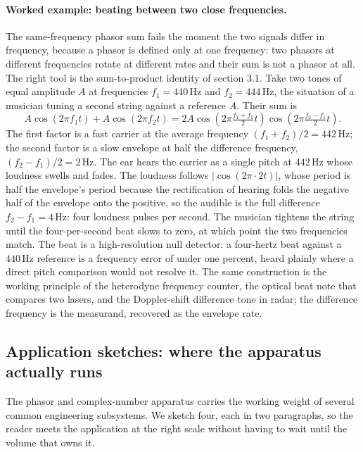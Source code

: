 \paragraph{Worked example: beating between two close frequencies.}
The same-frequency phasor sum fails the moment the two signals differ
in frequency, because a phasor is defined only at one frequency: two
phasors at different frequencies rotate at different rates and their
sum is not a phasor at all. The right tool is the sum-to-product
identity of section 3.1. Take two tones of equal amplitude $A$ at
frequencies $f_{1} = 440\,\si{\hertz}$ and $f_{2} = 444\,\si{\hertz}$,
the situation of a musician tuning a second string against a reference
$A$. Their sum is
\[
A\cos(2\pi f_{1} t) + A\cos(2\pi f_{2} t)
= 2A\cos\!\left(2\pi \tfrac{f_{1} + f_{2}}{2} t\right)
\cos\!\left(2\pi \tfrac{f_{2} - f_{1}}{2} t\right).
\]
The first factor is a fast carrier at the average frequency $(f_{1} +
f_{2})/2 = 442\,\si{\hertz}$; the second factor is a slow envelope at
half the difference frequency, $(f_{2} - f_{1})/2 = 2\,\si{\hertz}$.
The ear hears the carrier as a single pitch at $442\,\si{\hertz}$ whose
loudness swells and fades. The loudness follows $|\cos(2\pi \cdot 2 t)|$,
whose period is half the envelope's period because the rectification
of hearing folds the negative half of the envelope onto the positive,
so the audible  is the full difference
$f_{2} - f_{1} = 4\,\si{\hertz}$: four loudness pulses per second. The
musician tightens the string until the four-per-second beat slows to
zero, at which point the two frequencies match. The beat is a
high-resolution null detector: a four-hertz beat against a
$440\,\si{\hertz}$ reference is a frequency error of under one percent,
heard plainly where a direct pitch comparison would not resolve it.
The same construction is the working principle of the heterodyne
frequency counter, the optical beat note that compares two lasers, and
the Doppler-shift difference tone in radar; the difference frequency is
the measurand, recovered as the envelope rate.

\subsection{Application sketches: where the apparatus actually
runs}

The phasor and complex-number apparatus carries the working weight
of several common engineering subsystems. We sketch four, each in
two paragraphs, so the reader meets the application at the right
scale without having to wait until the volume that owns it.

